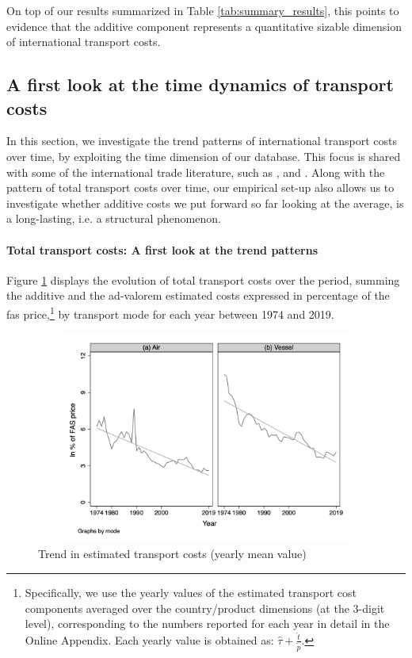 \documentclass[a4paper,11pt]{article}
\begin{document}
On top of our results summarized in Table \ref{tab:summary_results}, this points to evidence that the additive component represents a quantitative sizable dimension of international transport costs.\smallskip


\subsection{A first look at the time dynamics of transport costs}

In this section, we investigate the trend patterns of international transport costs over time, by exploiting the time dimension of our database.
This focus is shared with some of the international trade literature, such as \cite{Lafourcade_Thisse}, \cite{hummels2007} and \cite{Behar_Venables}. Along with the pattern of total transport costs over time, our empirical set-up also allows us to investigate whether additive costs we put forward so far looking at the average, is a long-lasting, i.e. a structural phenomenon.

\paragraph{Total transport costs: A first look at the trend patterns} Figure \ref{fig:Trends_in_TC} displays the evolution of total transport costs over the period, summing the additive and the ad-valorem estimated costs expressed in percentage of the fas price,\footnote{Specifically, we use the yearly values of the estimated transport cost components averaged over the country/product dimensions (at the 3-digit level), corresponding to the numbers reported for each year in detail in the Online Appendix.
Each yearly value is obtained as: $\widehat{\tau}+\frac{\widehat{t}}{\widetilde{p}}$.} by transport mode for each year between 1974 and 2019.

\begin{figure}[htbp]
\caption{Trend in estimated transport costs (yearly mean value)}
\label{fig:Trends_in_TC}
\begin{center}
\includegraphics[width=14cm, height=7cm]{Figure2_Trend_of_totalTC_bymode.jpg}
\end{center}
\end{figure}
\end{document}
